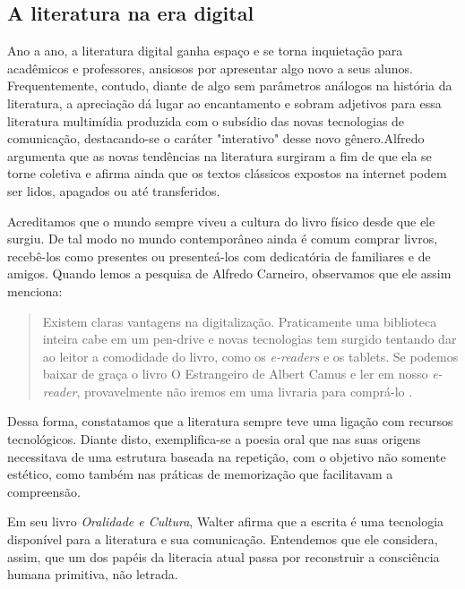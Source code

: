 \begin{refsection}
    \section{A literatura na era digital}

    Ano a ano, a literatura digital ganha espaço e se torna inquietação para acadêmicos e professores, ansiosos por apresentar algo novo a seus alunos. Frequentemente, contudo, diante de algo sem parâmetros análogos na história da literatura, a apreciação dá lugar ao encantamento e sobram adjetivos para essa literatura multimídia produzida com o subsídio das novas tecnologias de comunicação, destacando-se o caráter "interativo" desse novo gênero.Alfredo \textcite{Carneiro2011Valor} argumenta que as novas tendências na literatura surgiram a fim de que ela se torne coletiva e afirma ainda que os textos clássicos expostos na internet podem ser lidos, apagados ou até transferidos.

    Acreditamos que o mundo sempre viveu a cultura do livro físico desde que ele surgiu. De tal modo no mundo contemporâneo ainda é comum comprar livros, recebê-los como presentes ou presenteá-los com dedicatória de familiares e de amigos.  Quando lemos a pesquisa de Alfredo Carneiro, observamos que ele assim menciona: 

    \begin{quotation}
        Existem claras vantagens na digitalização. Praticamente uma biblioteca inteira cabe em um pen-drive e novas tecnologias tem surgido tentando dar ao leitor a comodidade do livro, como os \textit{e-readers} e os tablets.  Se podemos baixar de graça o livro O Estrangeiro de Albert Camus e ler em nosso \textit{e-reader}, provavelmente não iremos em uma livraria para comprá-lo \cite[p.~1]{Carneiro2011Valor}.
    \end{quotation}

    Dessa forma, constatamos que a literatura sempre teve uma ligação com recursos tecnológicos. Diante disto, exemplifica-se a poesia oral que nas suas origens necessitava de uma estrutura baseada na repetição, com o objetivo não somente estético, como também nas práticas de memorização que facilitavam a compreensão. 

    Em seu livro \textit{Oralidade e Cultura}, Walter \textcite{Ong1996Oralidad} afirma que a escrita é uma tecnologia disponível para a literatura e sua comunicação. Entendemos que ele considera, assim, que um dos papéis da literacia atual passa por reconstruir a consciência humana primitiva, não letrada. 


\end{refsection}

